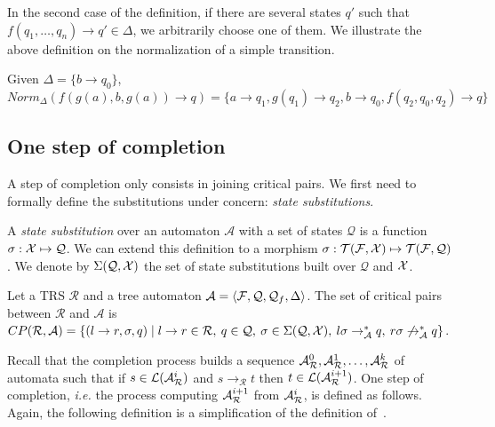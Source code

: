 \documentclass[a4paper,11pt]{llncs}
\newcommand{\A}{\mathcal{A}}
\newcommand{\Q}{\mathcal{Q}}
\def \R {\mathcal{R}}
\newcommand{\Lang}{\mathcal{L}}
\newcommand{\F}{{\cal F}}
\newcommand{\X}{{\cal X}}
\newcommand{\TFX}{{\cal T(F, X)}}
\newcommand{\rw}{\rightarrow}
\newcommand{\Norm}{Norm}
\newcommand{\aaex}{{\cal A}_{\R}}
\newcommand{\sep}{\; | \;}
\newcommand{\aut}{\langle \F, \Q, \Q_f, \Delta \rangle}
\theoremstyle{plain}
\begin{document}
\noindent
In the second case of the definition, if there are several states $q'$ such that $f(q_1,\ldots,q_n) \rw
q' \in \Delta$, we arbitrarily choose one of them. We illustrate the above definition on the
normalization of a simple transition.
\begin{example}
Given $\Delta=\{b \rw q_0\}$, 
$\Norm_\Delta(f(g(a), b, g(a))\rw q) = \{a \rw q_1, g(q_1) \rw q_2, b \rw q_0, f(q_2, q_0, q_2) \rw q\}$
\end{example}



\subsection{One step of completion}
\label{sec:eqcompletionalgo}

A step of completion only consists in joining critical pairs. We first need to
formally define the substitutions under concern: {\em state substitutions}.


\begin{definition}[State substitutions, $\Sigma(\Q,\X)$]
\label{def:qsubst}
A {\em state substitution} over an automaton
$\A$ with a
set of states $\Q$ is a function $\sigma: \X \mapsto \Q$. We can extend this definition to a morphism
$\sigma: \TFX \mapsto \mathcal{T}(\mathcal{F},\mathcal{Q})$.
We denote by $\Sigma(\Q, \X)$ the set of state substitutions built over $\Q$ and $\X$.
\end{definition}












\begin{definition}
Let a TRS $\R$ and a tree automaton $\A=\aut$. The set of critical
pairs between $\R$ and $\A$ is $CP(\R,\A)=\{(l\rw r, \sigma, q) \sep l
\rw r \in \R, \: q \in \Q, \: \sigma\in \Sigma(\Q, \X), \: l\sigma \rw_{\A}^* q,
\: r\sigma \not\rw_{\A}^*q 
\}$. 
\end{definition}

\noindent
Recall that the completion process builds a sequence
$\aaex^0,\aaex^1,\ldots,\aaex^k$ of automata such that if $s\in\Lang(\aaex^i)$
and $s\rw_{\R} t$ then $t\in\Lang(\aaex^{i+1})$. One step of completion,
{\em i.e.} the process computing $\aaex^{i+1}$ from $\aaex^i$, is defined as follows.
Again, the following definition is a simplification of the definition of~\cite{GenetR-JSC10}.
\end{document}

